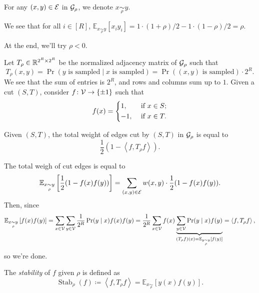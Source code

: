 \begin{notation}
	For any \((x, y)\in \mathcal{\MakeUppercase{e}} \) in \(\mathcal{\MakeUppercase{g}} _\rho \), we denote \(x \underset{\rho }{\sim } y\).
\end{notation}

We see that for all \(i\in [R]\), \(\mathbb{E}_{x \underset{\rho }{\sim }y }\left[x_i y_i \right] = 1\cdot (1+\rho )/2 - 1\cdot (1 - \rho ) / 2 = \rho \).

\begin{note}
	At the end, we'll try \(\rho < 0\).
\end{note}

Let \(T_\rho \in \mathbb{\MakeUppercase{r}} ^{2^R \times 2^R}\) be the normalized adjacency matrix of \(\mathcal{\MakeUppercase{g}} _\rho \) such that
\[
	T_{\rho } (x, y)
	= \Pr_{}(\text{\(y\) is sampled} \mid \text{\(x\) is sampled} )
	= \Pr_{}(\text{\((x, y)\) is sampled} ) \cdot 2^R.
\]
We see that the sum of entries is \(2^R\), and rows and columns sum up to \(1\). Given a cut \((S, T)\), consider \(f\colon \mathcal{\MakeUppercase{v}} \to \left\{ \pm 1 \right\} \) such that
\[
	f(x) = \begin{dcases}
		1,  & \text{ if } x\in S ; \\
		-1, & \text{ if } x\in T .
	\end{dcases}
\]

\begin{claim}
	Given \((S, T)\), the total weight of edges cut by \((S, T)\) in \(\mathcal{\MakeUppercase{g}} _{\rho }\) is equal to
	\[
		\frac{1}{2} (1 - \left\langle f, T_\rho f \right\rangle ).
	\]
\end{claim}
\begin{explanation}
	The total weigh of cut edges is equal to
	\[
		\mathbb{E}_{x \underset{\rho }{\sim }y }\left[ \frac{1}{2} (1 - f(x) f(y)) \right]
		= \sum_{(x, y)\in \mathcal{\MakeUppercase{e}} } w(x, y)\cdot \frac{1}{2}(1 - f(x) f(y)).
	\]
	Then, since
	\[
		\mathbb{E}_{x \underset{\rho }{\sim } y}\left[f(x) f(y) \right]
		= \sum_{x\in \mathcal{\MakeUppercase{v}} } \sum_{y\in \mathcal{\MakeUppercase{v}} } \frac{1}{2^R} \Pr_{}(y\mid x) f(x) f(y)
		= \frac{1}{2^R} \sum_{x\in \mathcal{\MakeUppercase{v}} } f(x) \underbrace{\sum_{y\in \mathcal{\MakeUppercase{v}} } \Pr_{}(y\mid x) f(y)}_{(T_\rho f)(x) = \mathbb{E}_{y \underset{\rho }{\sim } y}\left[ f(y)\right] }
		= \left\langle f, T_{\rho } f \right\rangle,
	\]
	so we're done.
\end{explanation}

\begin{definition}[Stability]\label{def:stability}
	The \emph{stability} of \(f\) given \(\rho \) is defined as
	\[
		\mathop{\mathrm{Stab}}_\rho (f) \coloneqq \left\langle f, T_\rho f \right\rangle = \mathbb{E}_{x \underset{\rho }{\sim } }\left[y(x)f(y) \right].
	\]
\end{definition}

